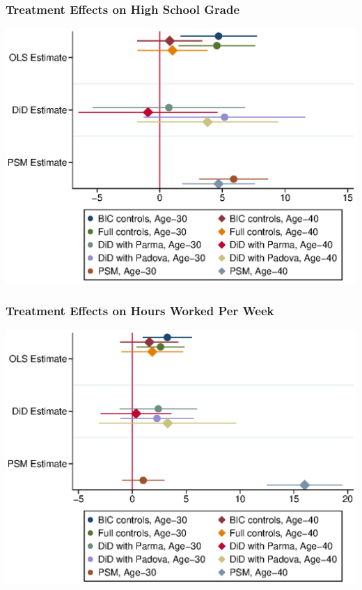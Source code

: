 \begin{frame}
	\frametitle{Treatment Effects on High School Grade} 
	\includegraphics[scale=0.8]{../../../output/image/coefplot-votoMaturita-adult}
\end{frame}

\begin{frame}
	\frametitle{Treatment Effects on Hours Worked Per Week} 
		\includegraphics[scale=0.8]{../../../output/image/coefplot-HrsTot-adult}
\end{frame}

